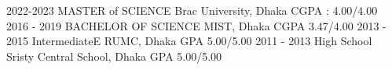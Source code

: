 
\horizontalLineLeft

\educationItem
    {2022-2023}
    {MASTER of SCIENCE}
    {Brac University, Dhaka}
    {CGPA : 4.00/4.00}
\educationItem
    {2016 - 2019}
    {BACHELOR OF SCIENCE}
    {MIST, Dhaka}
    {CGPA 3.47/4.00}
\educationItem
    {2013 - 2015}
    {IntermediateE}
    {RUMC, Dhaka}
    {GPA 5.00/5.00}
\educationItem
    {2011 - 2013}
    {High School}
    {Sristy Central School, Dhaka}
    {GPA 5.00/5.00}
\sectionsep
